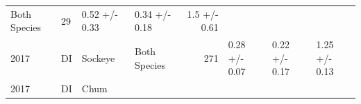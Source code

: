 \documentclass[fleqn,10pt]{wlpeerj} %
\begin{document}
\begin{longtable}[]{@{}llllrlll@{}}
\begin{minipage}[t]{0.11\columnwidth}
Both Species\strut
\end{minipage} & \begin{minipage}[t]{0.04\columnwidth}\raggedleft\strut
29\strut
\end{minipage} & \begin{minipage}[t]{0.14\columnwidth}\raggedright\strut
0.52 +/- 0.33\strut
\end{minipage} & \begin{minipage}[t]{0.14\columnwidth}\raggedright\strut
0.34 +/- 0.18\strut
\end{minipage} & \begin{minipage}[t]{0.14\columnwidth}\raggedright\strut
1.5 +/- 0.61\strut
\end{minipage}\tabularnewline
\begin{minipage}[t]{0.09\columnwidth}\raggedright\strut
2017\strut
\end{minipage} & \begin{minipage}[t]{0.06\columnwidth}\raggedright\strut
DI\strut
\end{minipage} & \begin{minipage}[t]{0.06\columnwidth}\raggedright\strut
Sockeye\strut
\end{minipage} & \begin{minipage}[t]{0.11\columnwidth}\raggedright\strut
Both Species\strut
\end{minipage} & \begin{minipage}[t]{0.04\columnwidth}\raggedleft\strut
271\strut
\end{minipage} & \begin{minipage}[t]{0.14\columnwidth}\raggedright\strut
0.28 +/- 0.07\strut
\end{minipage} & \begin{minipage}[t]{0.14\columnwidth}\raggedright\strut
0.22 +/- 0.17\strut
\end{minipage} & \begin{minipage}[t]{0.14\columnwidth}\raggedright\strut
1.25 +/- 0.13\strut
\end{minipage}\tabularnewline
\begin{minipage}[t]{0.09\columnwidth}\raggedright\strut
2017\strut
\end{minipage} & \begin{minipage}[t]{0.06\columnwidth}\raggedright\strut
DI\strut
\end{minipage} & \begin{minipage}[t]{0.06\columnwidth}\raggedright\strut
Chum\strut
\end{minipage} & \begin{minipage}[t]{0.11\columnwidth}\raggedright\strut

\end{minipage}
\end{longtable}
\end{document}
